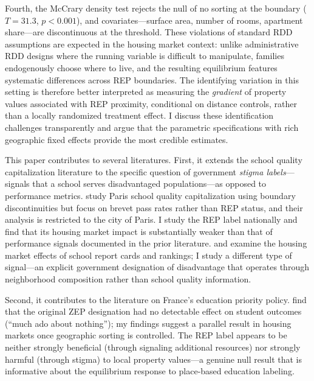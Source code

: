 \documentclass[12pt]{article}
\begin{document}
Fourth, the McCrary density test rejects the null of no sorting at the boundary ($T = 31.3$, $p < 0.001$), and covariates---surface area, number of rooms, apartment share---are discontinuous at the threshold. These violations of standard RDD assumptions are expected in the housing market context: unlike administrative RDD designs where the running variable is difficult to manipulate, families endogenously choose where to live, and the resulting equilibrium features systematic differences across REP boundaries. The identifying variation in this setting is therefore better interpreted as measuring the \textit{gradient} of property values associated with REP proximity, conditional on distance controls, rather than a locally randomized treatment effect. I discuss these identification challenges transparently and argue that the parametric specifications with rich geographic fixed effects provide the most credible estimates.

This paper contributes to several literatures. First, it extends the school quality capitalization literature \citep{black1999, bayer2007, gibbons2013, machin2011} to the specific question of government \textit{stigma labels}---signals that a school serves disadvantaged populations---as opposed to performance metrics. \citet{fack2010} study Paris school quality capitalization using boundary discontinuities but focus on brevet pass rates rather than REP status, and their analysis is restricted to the city of Paris. I study the REP label nationally and find that its housing market impact is substantially weaker than that of performance signals documented in the prior literature. \citet{figlio2004} and \citet{friesen2012} examine the housing market effects of school report cards and rankings; I study a different type of signal---an explicit government designation of disadvantage that operates through neighborhood composition rather than school quality information.

Second, it contributes to the literature on France's education priority policy. \citet{beffy2009} find that the original ZEP designation had no detectable effect on student outcomes (``much ado about nothing''); my findings suggest a parallel result in housing markets once geographic sorting is controlled. The REP label appears to be neither strongly beneficial (through signaling additional resources) nor strongly harmful (through stigma) to local property values---a genuine null result that is informative about the equilibrium response to place-based education labeling.
\end{document}
